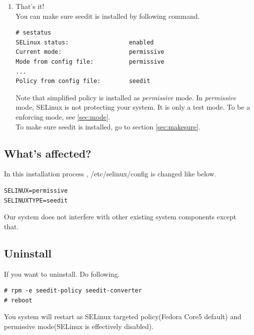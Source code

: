 \documentclass{article}
\begin{document}
\begin{enumerate}
 \item That's it!\\
You can make sure seedit is installed by following command.
\begin{verbatim}
# sestatus
SELinux status:                 enabled
Current mode:                   permissive
Mode from config file:          permissive
...
Policy from config file:        seedit
\end{verbatim}
Note that simplified policy is installed as {\it permissive} mode.
In {\it permissive} mode, SELinux is not protecting your system. It is
 only a test mode. To be a enforcing mode, see \ref{sec:mode}.\\
To make sure seedit is installed, go to section \ref{sec:makesure}.
\end{enumerate}

 \subsection{What's affected?}
 In this installation process ,
/etc/selinux/config is changed like below.
\begin{verbatim}
SELINUX=permissive	
SELINUXTYPE=seedit
\end{verbatim}
Our system does not interfere with other existing system components
except that.
\subsection{Uninstall}
If you want to uninstall. Do following.
\begin{verbatim}
# rpm -e seedit-policy seedit-converter	
# reboot
\end{verbatim}
You system will restart as SELinux targeted policy(Fedora Core5 default)
and permissive mode(SELinux is effectively disabled).
\end{document}
